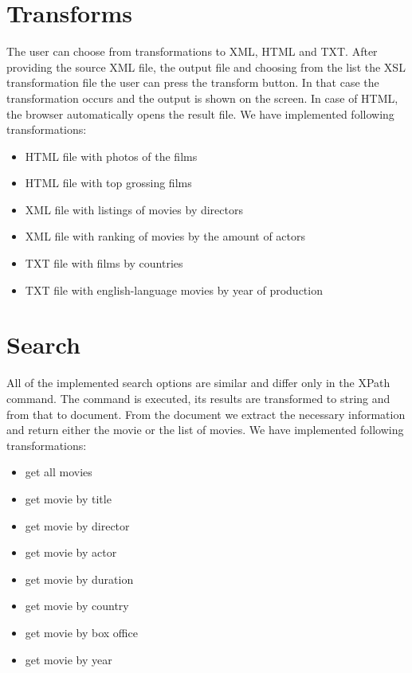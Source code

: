 \documentclass[a4paper,12pt]{article}
\begin{document}
\section{Transforms}
The user can choose from transformations to XML, HTML and TXT. After providing the source XML file, the output file and choosing from the list the XSL transformation file the user can press the transform button. In that case the transformation occurs and the output is shown on the screen. In case of HTML, the browser automatically opens the result file. We have implemented following transformations:
\begin{itemize}
	\item HTML file with photos of the films
	\item HTML file with top grossing films
	\item XML file with listings of movies by directors
	\item XML file with ranking of movies by the amount of actors
	\item TXT file with films by countries
	\item TXT file with english-language movies by year of production
\end{itemize}


\section{Search}
All of the implemented search options are similar and differ only in the XPath command. The command is executed, its results are transformed to string and from that to document. From the document we extract the necessary information and return either the movie or the list of movies. We have implemented following transformations:
\begin{itemize}
	\item get all movies
	\item get movie by title
	\item get movie by director
	\item get movie by actor
	\item get movie by duration
	\item get movie by country
	\item get movie by box office
	\item get movie by year
\end{itemize}
\end{document}
